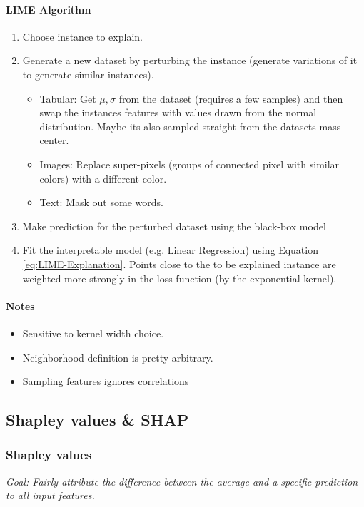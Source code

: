 \paragraph{LIME Algorithm}
\begin{enumerate}
	\item Choose instance to explain.
	\item Generate a new dataset by perturbing the instance (generate variations of it to generate similar instances).
	      \begin{itemize}
		      \item Tabular: Get $\mu, \sigma$ from the dataset (requires a few samples) and then swap the instances features with values drawn from the normal distribution.
		            Maybe its also sampled straight from the datasets mass center.
		      \item Images: Replace super-pixels (groups of connected pixel with similar colors) with a different color.
		      \item Text: Mask out some words.
	      \end{itemize}
	\item Make prediction for the perturbed dataset using the black-box model
	\item Fit the interpretable model (e.g. Linear Regression) using Equation \ref{eq:LIME-Explanation}.
	      Points close to the to be explained instance are weighted more strongly in the loss function (by the exponential kernel).
\end{enumerate}

\paragraph{Notes}
\begin{itemize}
	\item Sensitive to kernel width choice.
	\item Neighborhood definition is pretty arbitrary.
	\item Sampling features ignores correlations
\end{itemize}


\subsection{Shapley values \& SHAP}
\subsubsection{Shapley values}
\textit{Goal: Fairly attribute the difference between the average and a specific prediction to all input features.}

